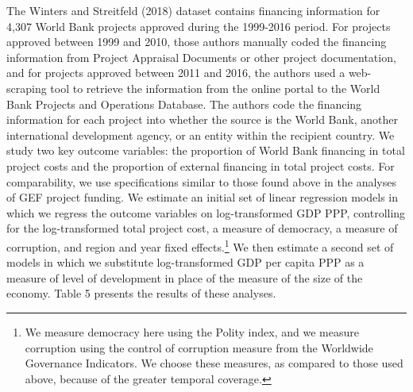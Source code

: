 \documentclass{article}
\begin{document}
The Winters and Streitfeld (2018) dataset contains financing information for 4,307 World Bank projects approved during the 1999-2016 period.  For projects approved between 1999 and 2010, those authors manually coded the financing information from Project Appraisal Documents or other project documentation, and for projects approved between 2011 and 2016, the authors used a web-scraping tool to retrieve the information from the online portal to the World Bank Projects and Operations Database.  The authors code the financing information for each project into whether the source is the World Bank, another international development agency, or an entity within the recipient country. We study two key outcome variables: the proportion of World Bank financing in total project costs and the proportion of external financing in total project costs. For comparability, we use specifications similar to those found above in the analyses of GEF project funding.  We estimate an initial set of linear regression models in which we regress the outcome variables on log-transformed GDP PPP, controlling for the log-transformed total project cost, a measure of democracy, a measure of corruption, and region and year fixed effects.\footnote{We measure democracy here using the Polity index, and we measure corruption using the control of corruption measure from the Worldwide Governance Indicators.  We choose these measures, as compared to those used above, because of the greater temporal coverage.}   We then estimate a second set of models in which we substitute log-transformed GDP per capita PPP as a measure of level of development in place of the measure of the size of the economy. Table 5 presents the results of these analyses. 
\end{document}
